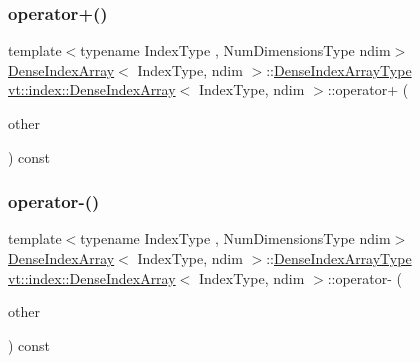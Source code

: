 \mbox{\label{structvt_1_1index_1_1_dense_index_array_a2f63f2603e58cf017c07f11f9e233409}} 
\subsubsection{\texorpdfstring{operator+()}{operator+()}}
{\footnotesize\ttfamily template$<$typename Index\+Type , Num\+Dimensions\+Type ndim$>$ \\
\hyperlink{structvt_1_1index_1_1_dense_index_array}{Dense\+Index\+Array}$<$ Index\+Type, ndim $>$\+::\hyperlink{structvt_1_1index_1_1_dense_index_array_aec95c4ed1b4071d31d24142f02429dbd}{Dense\+Index\+Array\+Type} \hyperlink{structvt_1_1index_1_1_dense_index_array}{vt\+::index\+::\+Dense\+Index\+Array}$<$ Index\+Type, ndim $>$\+::operator+ (\begin{DoxyParamCaption}\item[{\hyperlink{structvt_1_1index_1_1_dense_index_array_aec95c4ed1b4071d31d24142f02429dbd}{Dense\+Index\+Array\+Type} const \&}]{other }\end{DoxyParamCaption}) const}

\mbox{\label{structvt_1_1index_1_1_dense_index_array_a828670d9617980741517481c39b8212f}} 
\subsubsection{\texorpdfstring{operator-\/()}{operator-()}}
{\footnotesize\ttfamily template$<$typename Index\+Type , Num\+Dimensions\+Type ndim$>$ \\
\hyperlink{structvt_1_1index_1_1_dense_index_array}{Dense\+Index\+Array}$<$ Index\+Type, ndim $>$\+::\hyperlink{structvt_1_1index_1_1_dense_index_array_aec95c4ed1b4071d31d24142f02429dbd}{Dense\+Index\+Array\+Type} \hyperlink{structvt_1_1index_1_1_dense_index_array}{vt\+::index\+::\+Dense\+Index\+Array}$<$ Index\+Type, ndim $>$\+::operator-\/ (\begin{DoxyParamCaption}\item[{\hyperlink{structvt_1_1index_1_1_dense_index_array_aec95c4ed1b4071d31d24142f02429dbd}{Dense\+Index\+Array\+Type} const \&}]{other }\end{DoxyParamCaption}) const}

